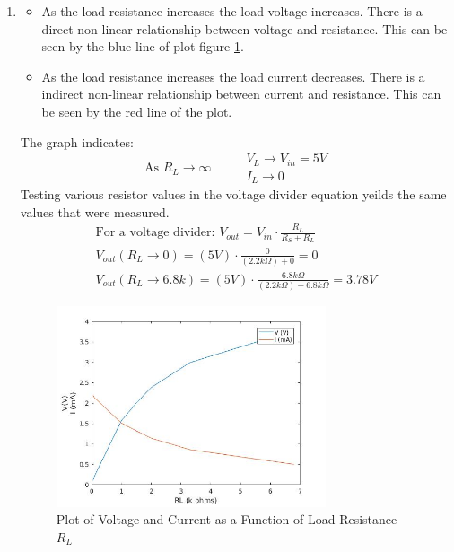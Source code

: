 \documentclass{article}
\begin{document}
\begin{enumerate}
  \item \begin{itemize}
    \item As the load resistance increases the load voltage increases.
    There is a direct non-linear relationship between voltage and resistance. This can be seen by the blue line of plot
    figure \ref{fig:currentvoltage}.
    \item As the load resistance increases the load current decreases.
   There is a indirect non-linear relationship between current and resistance. This can be seen by the red line of the plot.
   \end{itemize}
  The graph indicates:
  \begin{equation}
    \text{ As } R_L \to \infty \hspace{1cm} \begin{matrix}
    V_L \to V_{in} = 5 V \\
    I_L \to 0
  \end{matrix}
  \end{equation}
  Testing various resistor values in the voltage divider equation yeilds the same
  values that were measured.
  \begin{gather}
    \text{For a voltage divider: } V_{out} = V_{in} \cdot \frac{R_L}{R_S+R_L} \\
    V_{out}(R_L \to 0) = (5 V) \cdot \frac{0}{(2.2 k \Omega)+0} = 0 \\
    V_{out}(R_L \to 6.8k ) = (5 V) \cdot \frac{6.8 k \Omega}{(2.2 k \Omega)+ 6.8 k \Omega} = 3.78V
  \end{gather}



    \begin{figure}[!ht]
  \centering
  \caption{Plot of Voltage and Current as a Function of Load Resistance $R_L$\label{fig:currentvoltage}}
  \includegraphics[width=0.75\textwidth]{img/plotc.jpg}
  \end{figure}



\end{enumerate}
\end{document}
